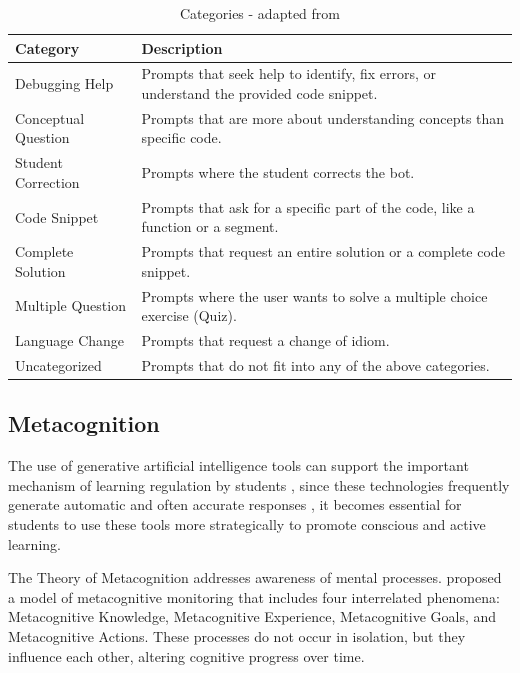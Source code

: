 \documentclass[a4paper,twoside]{article}
\begin{document}
\begin{table}[htbp]
  \caption{Categories - adapted from \cite{Ghimire24}}
  \begin{center}
    \renewcommand{\arraystretch}{1.6} %
    \begin{tabular}{p{3cm} p{12cm}} %
      \hline
      \textbf{Category} & \textbf{Description} \\
      \hline
      Debugging Help & Prompts that seek help to identify, fix errors, or understand the provided code snippet. \\
      Conceptual Question & Prompts that are more about understanding concepts than specific code. \\
      Student Correction & Prompts where the student corrects the bot. \\
      Code Snippet & Prompts that ask for a specific part of the code, like a function or a segment. \\
      Complete Solution & Prompts that request an entire solution or a complete code snippet. \\
      Multiple Question & Prompts where the user wants to solve a multiple choice exercise (Quiz). \\
      Language Change & Prompts that request a change of idiom. \\
      Uncategorized & Prompts that do not fit into any of the above categories. \\
      \hline
    \end{tabular}
    \label{tab:categories}
  \end{center}
\end{table}

\subsection{Metacognition}

The use of generative artificial intelligence tools can support the important
mechanism of learning regulation by students \citep{larsen18}, since these
technologies frequently generate automatic and often accurate responses
\cite{Puryear22}, it becomes essential for students to use these tools more
strategically to promote conscious and active learning.

The Theory of Metacognition addresses awareness of mental processes.
\cite{flavell79} proposed a model of metacognitive monitoring that includes four
interrelated phenomena: Metacognitive Knowledge, Metacognitive Experience,
 Metacognitive Goals, and Metacognitive Actions. These processes do not occur
in isolation, but they influence each other, altering cognitive progress over
time.
\end{document}
